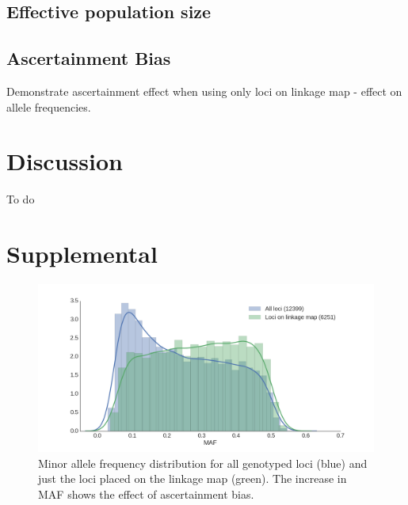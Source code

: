 \documentclass[12pt,  one column]{article}
\begin{document}
\subsection*{Effective population size}

\subsection*{Ascertainment Bias}
Demonstrate ascertainment effect when using only loci on linkage map - effect on allele frequencies.


\section*{Discussion}
To do

\section*{Supplemental}

\begin{figure}[H]
\includegraphics[scale=.3]{figures/supplemental/ascertainment.png}
\caption{Minor allele frequency distribution for all genotyped loci (blue) and just the loci placed on the linkage map (green). The increase in MAF shows the effect of ascertainment bias.}
\end{figure}
\end{document}
